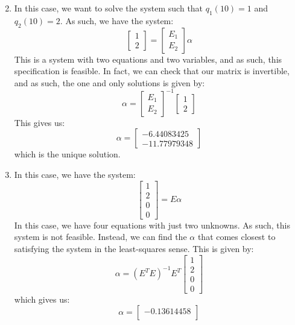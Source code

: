 \documentclass[12pt]{exam}
\begin{document}
\begin{questions}
\begin{solution}
\begin{enumerate}[label=(\alph*)]
\[        \]
      \item
        In this case, we want to solve the system such that $q_1(10) = 1$ and $q_2(10) = 2$. As such, we have the system:
        \[
          \begin{bmatrix}
            1 \\
            2
          \end{bmatrix} = 
          \begin{bmatrix}
            E_1 \\
            E_2
          \end{bmatrix} \alpha
        \]
        This is a system with two equations and two variables, and as such, this specification is feasible. In fact, we can check that our matrix is invertible, and as such, the one and only solutions is given by:
        $$
          \alpha = \begin{bmatrix} E_1 \\ E_2 \end{bmatrix}^{-1}\begin{bmatrix} 1\\ 2 \end{bmatrix}
        $$
        This gives us:
        \[  
          \alpha = 
          \begin{bmatrix}
            -6.44083425 \\
            -11.77979348
          \end{bmatrix}
        \]
        which is the unique solution.
      \item In this case, we have the system:
      \[
        \begin{bmatrix}
          1 \\
          2 \\
          0 \\
          0
        \end{bmatrix} = E\alpha
      \]
      In this case, we have four equations with just two unknowns. As such, this system is not feasible. Instead, we can find the $\alpha$ that comes closest to satisfying the system in the least-squares sense. This is given by:
      \[
        \alpha = (E^TE)^{-1}E^T \begin{bmatrix} 1 \\ 2 \\ 0 \\ 0 \end{bmatrix}
      \]
      which gives us:
      \[
        \alpha =
          \begin{bmatrix}
            -0.13614458 \\

\end{bmatrix}\]
\end{enumerate}
\end{solution}
\end{questions}
\end{document}
